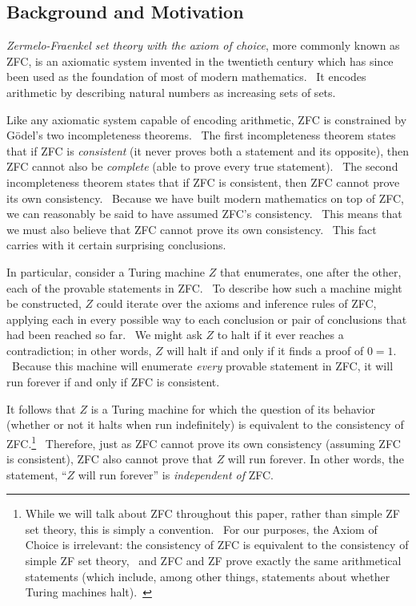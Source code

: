 \documentclass[11pt]{article}
\begin{document}
\subsection{Background and Motivation \label{sec:background}}

\emph{Zermelo-Fraenkel set theory with the axiom of choice}, more commonly known as ZFC, is an axiomatic system invented in the twentieth century which has since been used as the foundation of most of modern mathematics. \ It encodes arithmetic by describing natural numbers as increasing sets of sets.

Like any axiomatic system capable of encoding arithmetic, ZFC is constrained by G\"{o}del's two incompleteness theorems. \ The first incompleteness theorem states that if ZFC is \emph{consistent} (it never proves both a statement and its opposite), then ZFC cannot also be \emph{complete} (able to prove every true statement). \ The second incompleteness theorem states that if ZFC is consistent, then ZFC cannot prove its own consistency. \ Because we have built modern mathematics on top of ZFC, we can reasonably be said to have assumed ZFC's consistency. \ This means that we must also believe that ZFC cannot prove its own consistency. \ This fact carries with it certain surprising conclusions.

In particular, consider a Turing machine $Z$ that enumerates, one after the other, each of the provable statements in ZFC. \ To describe how such a machine might be constructed, $Z$ could iterate over the axioms and inference rules of ZFC, applying each in every possible way to each conclusion or pair of conclusions that had been reached so far. \ We might ask $Z$ to halt if it ever reaches a contradiction; in other words, $Z$ will halt if and only if it finds a proof of $0 = 1$. \ Because this machine will enumerate \emph{every} provable statement in ZFC, it will run forever if and only if ZFC is consistent.

It follows that $Z$ is a Turing machine for which the question of its behavior (whether or not it halts when run indefinitely) is equivalent to the consistency of ZFC.\footnote{While we will talk about ZFC throughout this paper, rather than simple ZF set theory, this is simply a convention. \ For our purposes, the Axiom of Choice is irrelevant: the consistency of ZFC is equivalent to the consistency of simple ZF set theory,~\cite{godelcohen} and ZFC and ZF prove exactly the same arithmetical statements (which include, among other things, statements about whether Turing machines halt).~\cite{schoenfield}} \ Therefore, just as ZFC cannot prove its own consistency (assuming ZFC is consistent), ZFC also cannot prove that $Z$ will run forever. In other words, the statement, ``$Z$ will run forever'' is \emph{independent of} ZFC.
\end{document}
